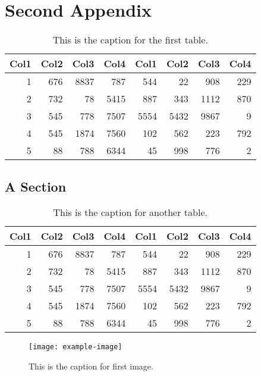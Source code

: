 \chapter{Second Appendix}
    \lipsum[1]
    \begin{table}
        \centering
        \begin{tabular}{r r r r r r r r}
             Col1 & Col2 & Col3 & Col4 & Col1 & Col2 & Col3 & Col4 \\
             \hline
             1    & 676  & 8837 & 787  & 544  & 22   & 908  & 229  \\
             2    & 732  & 78   & 5415 & 887  & 343  & 1112 & 870  \\
             3    & 545  & 778  & 7507 & 5554 & 5432 & 9867 & 9    \\
             4    & 545  & 1874 & 7560 & 102  & 562  & 223  & 792  \\
             5    & 88   & 788  & 6344 & 45   & 998  & 776  & 2    \\
             \hline
        \end{tabular}
        \captionsetup{width=3.9in}
        \caption{This is the caption for the first table.}
    \end{table}
    \lipsum[2]

\section{A Section}
    \lipsum[3]
    \begin{table}
        \centering
        \begin{tabular}{r r r r r r r r}
             Col1 & Col2 & Col3 & Col4 & Col1 & Col2 & Col3 & Col4 \\
             \hline
             1    & 676  & 8837 & 787  & 544  & 22   & 908  & 229  \\
             2    & 732  & 78   & 5415 & 887  & 343  & 1112 & 870  \\
             3    & 545  & 778  & 7507 & 5554 & 5432 & 9867 & 9    \\
             4    & 545  & 1874 & 7560 & 102  & 562  & 223  & 792  \\
             5    & 88   & 788  & 6344 & 45   & 998  & 776  & 2    \\
             \hline
        \end{tabular}
        \captionsetup{width=3.9in}
        \caption{This is the caption for another table.}
    \end{table}
    \lipsum[4-5]
    \begin{figure}
        \centering
        \texttt{[image: example-image]}
        \captionsetup{width=3.5in}
        \caption{This is the caption for first image.}
    \end{figure}

